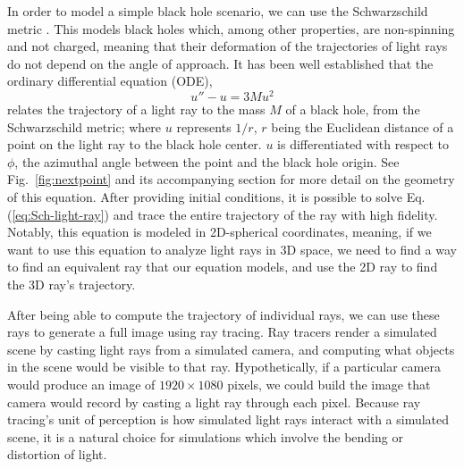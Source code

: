 In order to model a simple black hole scenario, we can use the Schwarzschild metric \cite{schw_soln-2007}.
This models black holes which, among other properties, are non-spinning and not charged,
meaning that their deformation of the trajectories of light rays do not depend on the angle of approach.
It has been well established \cite{gravitation-mtw} that the ordinary differential equation (ODE),
\begin{equation}
	u'' - u = 3 M u^2
	\label{eq:Sch-light-ray}
\end{equation}
relates the trajectory of a light ray to the mass $M$ of a black hole, from the Schwarzschild metric;
where $u$ represents $1/r$, $r$ being the Euclidean distance of a point on the light ray to the black hole center.
$u$ is differentiated with respect to $\phi$, the azimuthal angle between the point and the black hole origin.
See Fig.~\ref{fig:nextpoint} and its accompanying section for more detail on the geometry of this equation.
After providing initial conditions,  it is possible to solve Eq.(\ref{eq:Sch-light-ray}) and trace the entire trajectory of the ray with high fidelity.
Notably, this equation is modeled in 2D-spherical coordinates, meaning, if we want to use this equation to analyze light rays in 3D space, we need to find a way to find an equivalent ray that our equation models, and use the 2D ray to find the 3D ray's trajectory.

After being able to compute the trajectory of individual rays, we can use these rays to generate a full image using ray tracing. Ray tracers render a simulated scene by casting light rays from a simulated camera, and computing what objects in the scene would be visible to that ray. Hypothetically, if a particular camera would produce an image of $1920 \times 1080$ pixels, we could build the image that camera would record by casting a light ray through each pixel. Because ray tracing's unit of perception is how simulated light rays interact with a simulated scene, it is a natural choice for simulations which involve the bending or distortion of light.




